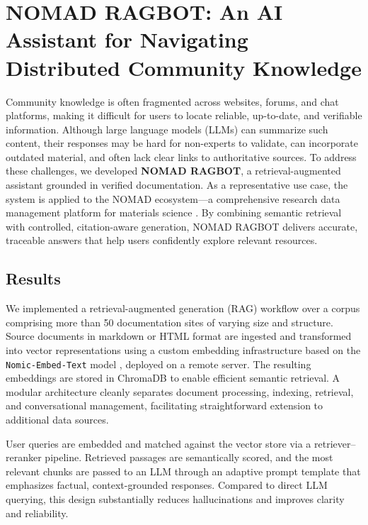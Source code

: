 

\section{NOMAD RAGBOT: An AI Assistant for Navigating Distributed Community Knowledge}

Community knowledge is often fragmented across websites, forums, and chat platforms, making it difficult for users to locate reliable, up-to-date, and verifiable information. Although large language models (LLMs) can summarize such content, their responses may be hard for non-experts to validate, can incorporate outdated material, and often lack clear links to authoritative sources. To address these challenges, we developed \textbf{NOMAD RAGBOT}, a retrieval-augmented assistant grounded in verified documentation. As a representative use case, the system is applied to the NOMAD ecosystem—a comprehensive research data management platform for materials science \cite{scheidgen2023nomad}. By combining semantic retrieval with controlled, citation-aware generation, NOMAD RAGBOT delivers accurate, traceable answers that help users confidently explore relevant resources.

\subsection*{Results}

We implemented a retrieval-augmented generation (RAG) workflow \cite{lewis2020retrieval} over a corpus comprising more than 50 documentation sites of varying size and structure. Source documents in markdown or HTML format are ingested and transformed into vector representations using a custom embedding infrastructure based on the \texttt{Nomic-Embed-Text} model \cite{nomic2024embed}, deployed on a remote server. The resulting embeddings are stored in ChromaDB \cite{chroma2023db} to enable efficient semantic retrieval. A modular architecture cleanly separates document processing, indexing, retrieval, and conversational management, facilitating straightforward extension to additional data sources.

User queries are embedded and matched against the vector store via a retriever–reranker pipeline. Retrieved passages are semantically scored, and the most relevant chunks are passed to an LLM through an adaptive prompt template that emphasizes factual, context-grounded responses. Compared to direct LLM querying, this design substantially reduces hallucinations and improves clarity and reliability.

